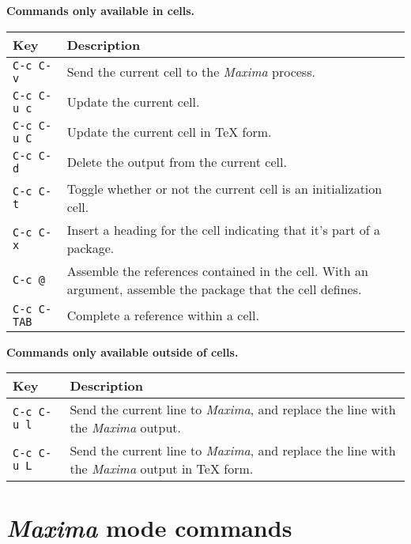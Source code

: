 \documentclass{article}
\newcommand{\mx}{\textsl{\sffamily Maxima}}
\begin{document}
\smallskip

\noindent
\textbf{Commands only available in cells.}

\smallskip

\noindent
\begin{tabular}{p{\firstcol}p{\secondcol}}
\hline
\textbf{Key} & \textbf{Description}\\
\hline
\texttt{C-c C-v}
& Send the current cell to the \mx{} process.\\
\texttt{C-c C-u c}
& Update the current cell.\\
\texttt{C-c C-u C}
& Update the current cell in \TeX{} form.\\
\texttt{C-c C-d}
& Delete the output from the current cell.\\
\texttt{C-c C-t}
& Toggle whether or not the current cell is an initialization cell.\\
\texttt{C-c C-x}
& Insert a heading for the cell indicating that it's part of a
package. \\
\texttt{C-c @}
& Assemble the references contained in the cell.  With an argument,
assemble the package that the cell defines.\\
\texttt{C-c C-\texttt{TAB}}
& Complete a reference within a cell.
\end{tabular}

\smallskip

\noindent
\textbf{Commands only available outside of cells.}

\smallskip

\noindent
\begin{tabular}{p{\firstcol}p{\secondcol}}
\hline
\textbf{Key} & \textbf{Description}\\
\hline
\texttt{C-c C-u l}
& Send the current line to \mx{}, and replace the line with the
\mx{} output.\\
\texttt{C-c C-u L}
& Send the current line to \mx{}, and replace the line with the
\mx{} output in \TeX{} form.
\end{tabular}

\newpage

\section{\mx{} mode commands}
\end{document}
